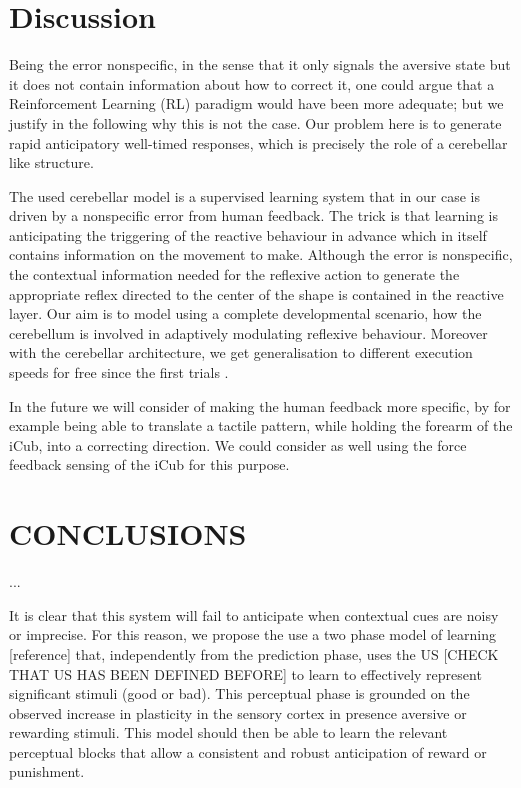 \documentclass[letterpaper, 10 pt, conference]{ieeeconf}  %
\begin{document}
{\section{Discussion}

Being the error nonspecific, in the sense that it only signals the aversive state but it does not contain information about how to correct it, one could argue that a Reinforcement Learning (RL) paradigm would have been more adequate; but we justify in the following why this is not the case. Our problem here is to generate rapid anticipatory well-timed responses, which is precisely the role of a cerebellar like structure.

The used cerebellar model \cite{herreros2013nucleo} is a supervised learning system that in our case is driven by a nonspecific error from human feedback. The trick is that learning is anticipating the triggering of the reactive behaviour in advance which in itself contains information on the movement to make. Although the error is nonspecific, the contextual information needed for the reflexive action to generate the appropriate reflex directed to the center of the shape is contained in the reactive layer. Our aim is to model using a complete developmental scenario, how the cerebellum is involved in adaptively modulating reflexive behaviour. Moreover with the cerebellar architecture, we get generalisation to different execution speeds for free since the first trials \cite{herreros2013speed}.  

In the future we will consider of making the human feedback more specific, by for example being able to translate a tactile pattern, while holding the forearm of the iCub, into a correcting direction. We could consider as well using the force feedback sensing of the iCub for this purpose.


\section{CONCLUSIONS}
\label{sec:conclusions}

...

It is clear that this system will fail to anticipate when contextual cues are noisy or imprecise. For this reason, we propose the use a two phase model of learning [reference] that, independently from the prediction phase, uses the US [CHECK THAT US HAS BEEN DEFINED BEFORE] to learn to effectively represent significant stimuli (good or bad). This perceptual phase is grounded on the observed increase in plasticity in the sensory cortex in presence aversive or rewarding stimuli. This model should then be able to learn the relevant perceptual blocks that allow a consistent and robust anticipation of reward or punishment. 

}
\end{document}
